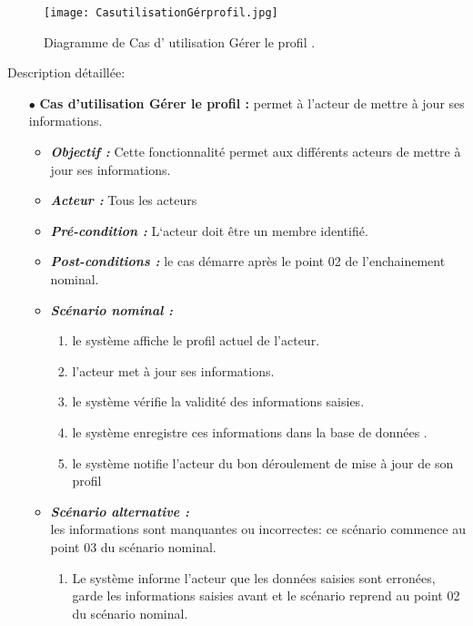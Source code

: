 \begin{figure}[ht]
	\centering
	\texttt{[image: CasutilisationGérprofil.jpg]}
	\caption{Diagramme de Cas d' utilisation Gérer le profil .}
	\label{fig:Gérer le profil }
\end{figure}
\FloatBarrier

{\Large \color{cyan} Description détaillée:}
\begin{itemize}
	
	\item[$\bullet$] \textbf{Cas d’utilisation Gérer le profil :} permet à l’acteur de mettre à jour ses informations.
	\medskip
	\begin{itemize}
		\item \textit{\textbf{Objectif :}}  Cette fonctionnalité permet aux différents acteurs de mettre à jour ses informations. 
		
		\item \textit{\textbf{Acteur :}} Tous les acteurs
		
		\item \textit{\textbf{Pré-condition  :}}  L‘acteur doit être un membre identifié.
		\item \textit{\textbf{Post-conditions   :}} le cas démarre après le point 02 de l’enchainement nominal.
		\item \textit{\textbf{Scénario nominal :}}
		\begin{enumerate}
			\item le système affiche le profil actuel de l’acteur. 
			\item l’acteur met à jour ses informations. 
			\item  le système vérifie la validité des informations saisies.  
			\item  le système enregistre ces informations dans la base de données .  
			\item le système notifie l’acteur du bon déroulement de mise à jour de son profil
		\end{enumerate}
		\item \textit{\textbf{Scénario alternative :}} \\
			les informations sont manquantes ou incorrectes: ce scénario commence au point 03 du
		scénario nominal.
		\begin{enumerate}
		
			\item Le système informe l’acteur que les données saisies sont erronées, garde les informations
			saisies avant et le scénario reprend au point 02 du scénario nominal. 
		\end{enumerate}
	\end{itemize}
\end{itemize}	
	\bigskip


